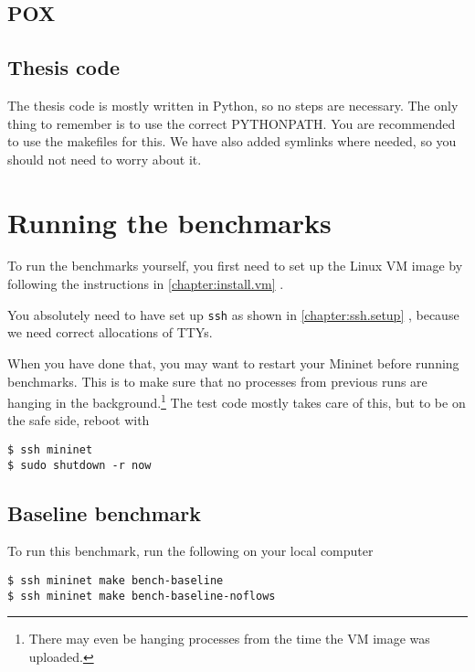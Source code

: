 \subsection{POX}


\subsection{Thesis code}

The thesis code is mostly written in Python, so no steps are necessary.
The only thing to remember is to use the correct PYTHONPATH.  You are
recommended to use the makefiles for this. We have also added symlinks where
needed, so you should not need to worry about it.


\section{Running the benchmarks}
\label{chapter:appendix.benchmark}

To run the benchmarks yourself, you first need to set up the Linux VM image
by following the instructions in \ref{chapter:install.vm}
.

You absolutely need to have set up \texttt{ssh} as shown in
\ref{chapter:ssh.setup} , because we need
correct allocations of TTYs.

When you have done that, you may want to restart your Mininet before running
benchmarks.  This is to make sure that no processes from previous runs are
hanging in the background.\footnote{There may even be hanging processes from
the time the VM image was uploaded.} The test code mostly takes care of
this, but to be on the safe side, reboot with

\begin{Verbatim}
$ ssh mininet
$ sudo shutdown -r now
\end{Verbatim}

\subsection{Baseline benchmark}
\label{chapter:appendix.baseline.benchmark}

To run this benchmark, run the following on your local computer

\begin{Verbatim}
$ ssh mininet make bench-baseline
$ ssh mininet make bench-baseline-noflows
\end{Verbatim}

